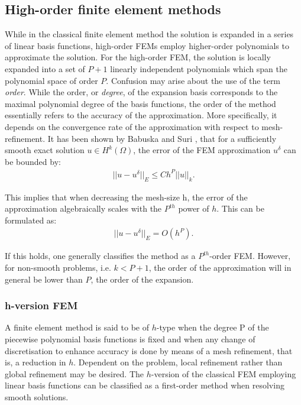 \subsection{High-order finite element methods}

While in the classical finite element method the solution is expanded in a
series of linear basis functions, high-order FEMs employ higher-order
polynomials to approximate the solution. For the high-order FEM, the solution is
locally expanded into a set of $P+1$ linearly independent polynomials which
span the polynomial space of order $P$. Confusion may arise about the use of
the term \emph{order}. While the order, or \emph{degree}, of the expansion
basis corresponds to the maximal polynomial degree of the basis functions, the order
of the method essentially refers to the accuracy of the approximation. More
specifically, it depends on the convergence rate of the approximation with
respect to mesh-refinement. It has been shown by Babuska and Suri \cite{BaSu94},
that for a sufficiently smooth exact solution $u\in H^k(\Omega)$, the
error of the FEM approximation $u^{\delta}$ can be bounded by:
\begin{align*}
||u-u^{\delta}||_{E}\leq Ch^P ||u||_k.
\end{align*}

This implies that when decreasing the mesh-size h, the error of the
approximation algebraically scales with the $P^{th}$ power of $h$.
This can be formulated as:
\begin{align*}
||u-u^{\delta}||_{E}=O(h^P).
\end{align*}

If this holds, one generally classifies the method as a
$P^{th}$-order FEM. However, for non-smooth problems, i.e.
$k<P+1$, the order of the approximation will in general be lower than
$P$, the order of the expansion.

\subsubsection{h-version FEM}

A finite element method is said to be of $h$-type when the degree P of the
piecewise polynomial basis functions is fixed and when any change of
discretisation to enhance accuracy is done by means of a mesh refinement, that
is, a reduction in $h$. Dependent on the problem, local refinement rather than
global refinement may be desired. The $h$-version of the classical FEM
employing linear basis functions can be classified as a first-order method when
resolving smooth solutions.

